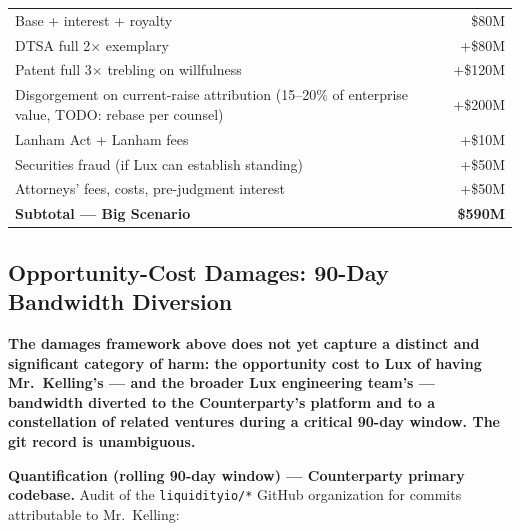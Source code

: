 \documentclass[11pt,letterpaper]{article}
\begin{document}
\begin{center}
\begin{tabular}{lr}
\toprule
Base + interest + royalty & \$80M \\
DTSA full 2$\times$ exemplary & +\$80M \\
Patent full 3$\times$ trebling on willfulness & +\$120M \\
Disgorgement on current-raise attribution (15--20\% of enterprise value, TODO: rebase per counsel) & +\$200M \\
Lanham Act + Lanham fees & +\$10M \\
Securities fraud (if Lux can establish standing) & +\$50M \\
Attorneys' fees, costs, pre-judgment interest & +\$50M \\
\midrule
\textbf{Subtotal --- Big Scenario} & \textbf{\$590M} \\
\bottomrule
\end{tabular}
\end{center}

\subsection*{Opportunity-Cost Damages: 90-Day Bandwidth Diversion}

\textbf{The damages framework above does not yet capture a distinct
and significant category of harm: the opportunity cost to Lux of
having Mr.\ Kelling's --- and the broader Lux engineering team's ---
bandwidth diverted to the Counterparty's platform and to a
constellation of related ventures during a critical 90-day window.
The git record is unambiguous.}

\textbf{Quantification (rolling 90-day window) --- Counterparty
primary codebase.} Audit of the \texttt{liquidityio/*} GitHub
organization for commits attributable to Mr.\ Kelling:
\end{document}
